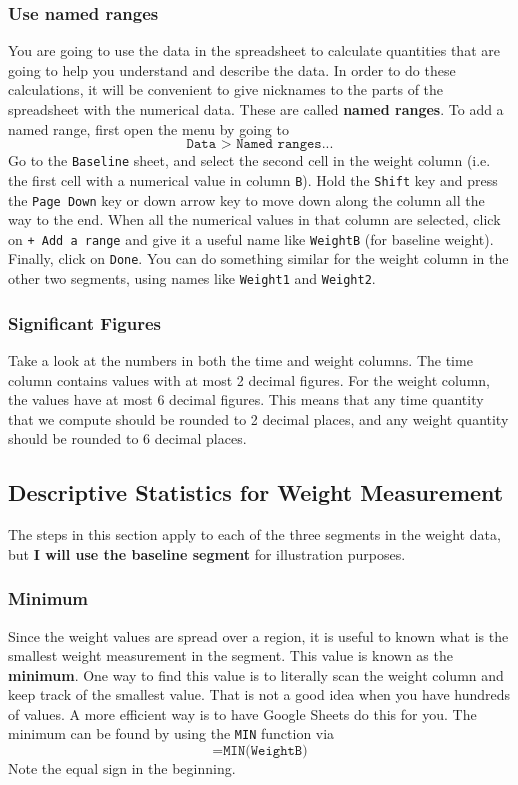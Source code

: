 \subsubsection{Use named ranges}
%
You are going to use the data in the spreadsheet to calculate quantities that are going to help you understand and describe the data. In order to do these calculations, it will be convenient to give nicknames to the parts of the spreadsheet with the numerical data. These are called \textbf{named ranges}. To add a named range, first open the menu by going to
\begin{equation}
    \texttt{Data > Named ranges...}
\end{equation}
Go to the \texttt{Baseline} sheet, and select the second cell in the weight column (i.e. the first cell with a numerical value in column \texttt{B}). Hold the \texttt{Shift} key and press the \texttt{Page Down} key or down arrow key to move down along the column all the way to the end. When all the numerical values in that column are selected, click on \texttt{+ Add a range} and give it a useful name like \texttt{WeightB} (for baseline weight). Finally, click on \texttt{Done}. You can do something similar for the weight column in the other two segments, using names like \texttt{Weight1} and \texttt{Weight2}.
%
\subsubsection{Significant Figures}
%
Take a look at the numbers in both the time and weight columns. The time column contains values with at most 2 decimal figures. For the weight column, the values have at most 6 decimal figures. This means that any time quantity that we compute should be rounded to 2 decimal places, and any weight quantity should be rounded to 6 decimal places.
%
\subsection{Descriptive Statistics for Weight Measurement}
%
The steps in this section apply to each of the three segments in the weight data, but \textbf{I will use the baseline segment} for illustration purposes.
%
\subsubsection{Minimum}
%
Since the weight values are spread over a region, it is useful to known what is the smallest weight measurement in the segment. This value is known as the \textbf{minimum}. One way to find this value is to literally scan the weight column and keep track of the smallest value. That is not a good idea when you have hundreds of values. A more efficient way is to have Google Sheets do this for you. The minimum can be found by using the \texttt{MIN} function via
\begin{equation}
    \texttt{=MIN(WeightB)}
    \label{eq:00.min}
\end{equation}
Note the equal sign in the beginning.
%

